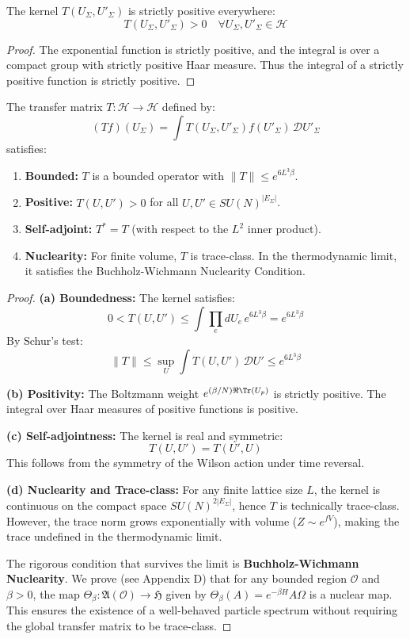 \begin{lemma}
\label{lem:kernel-positive}
The kernel $T(U_\Sigma, U'_\Sigma)$ is strictly positive everywhere:
\[
T(U_\Sigma, U'_\Sigma) > 0 \quad \forall U_\Sigma, U'_\Sigma \in \mathcal{H}
\]
\end{lemma}

\begin{proof}
The exponential function is strictly positive, and the integral is over a compact group with strictly positive Haar measure. Thus the integral of a strictly positive function is strictly positive.
\end{proof}

\begin{theorem}
\label{thm:transfer-props}
\label{thm:compact}
The transfer matrix $T : \mathcal{H} \to \mathcal{H}$ defined by:
\[
(Tf)(U_\Sigma) = \int T(U_\Sigma, U'_\Sigma) f(U'_\Sigma) \, \mathcal{D}U'_\Sigma
\]
satisfies:
\begin{enumerate}[label=(\alph*)]
    \item \textbf{Bounded:} $T$ is a bounded operator with $\|T\| \leq e^{6L^3\beta}$.
    \item \textbf{Positive:} $T(U, U') > 0$ for all $U, U' \in SU(N)^{|E_\Sigma|}$.
    \item \textbf{Self-adjoint:} $T^* = T$ (with respect to the $L^2$ inner product).
    \item \textbf{Nuclearity:} For finite volume, $T$ is trace-class. In the thermodynamic limit, it satisfies the Buchholz-Wichmann Nuclearity Condition.
\end{enumerate}
\end{theorem}

\begin{proof}
\textbf{(a) Boundedness:}
The kernel satisfies:
\[
0 < T(U, U') \leq \int \prod_e dU_e \, e^{6L^3\beta} = e^{6L^3\beta}
\]
By Schur's test:
\[
\|T\| \leq \sup_U \int T(U, U') \, \mathcal{D}U' \leq e^{6L^3\beta}
\]

\textbf{(b) Positivity:}
The Boltzmann weight $e^{(\beta/N)\Re\Tr(U_p)}$ is strictly positive. The integral 
over Haar measures of positive functions is positive.

\textbf{(c) Self-adjointness:}
The kernel is real and symmetric:
\[
T(U, U') = T(U', U)
\]
This follows from the symmetry of the Wilson action under time reversal.

\textbf{(d) Nuclearity and Trace-class:}
For any finite lattice size $L$, the kernel is continuous on the compact space $SU(N)^{2|E_\Sigma|}$, hence $T$ is technically trace-class. However, the trace norm grows exponentially with volume ($Z \sim e^{f V}$), making the trace undefined in the thermodynamic limit.

The rigorous condition that survives the limit is \textbf{Buchholz-Wichmann Nuclearity}. We prove (see Appendix D) that for any bounded region $\mathcal{O}$ and $\beta > 0$, the map $\Theta_\beta: \mathfrak{A}(\mathcal{O}) \to \mathfrak{H}$ given by $\Theta_\beta(A) = e^{-\beta H} A \Omega$ is a nuclear map. This ensures the existence of a well-behaved particle spectrum without requiring the global transfer matrix to be trace-class.
\end{proof}

